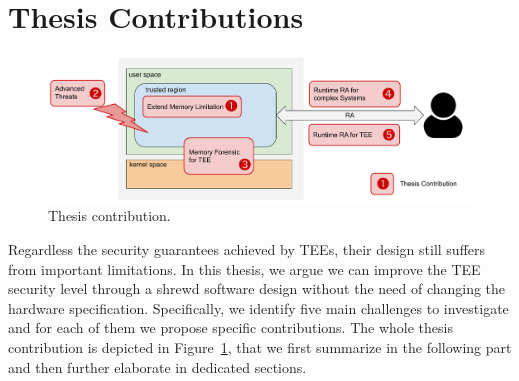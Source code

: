 \section{Thesis Contributions}

\begin{figure}[t]
	\centering
	\includegraphics[width=\textwidth]{fig_c1/contribution.pdf}
	\caption[Thesis contribution.]{Thesis contribution.}
	\label{fig:contribution}
\end{figure}

Regardless the security guarantees achieved by TEEs, their design still 
suffers from important limitations.
In this thesis, we argue we can improve the TEE security level
through a shrewd software design without the need 
of changing the hardware specification.
Specifically, we identify five main challenges to investigate and for each of 
them we propose specific contributions.
The whole thesis contribution is depicted in 
Figure~\ref{fig:contribution}, that we first summarize in the following part 
and then further elaborate in dedicated sections.

